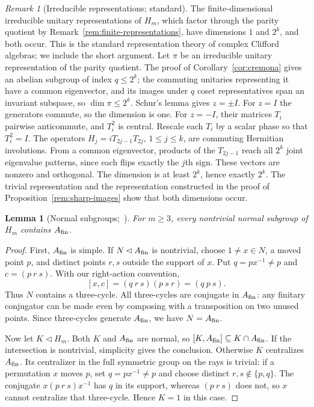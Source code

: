 \documentclass[11pt,a4paper]{article}
\theoremstyle{plain}
\newtheorem{lemma}[theorem]{Lemma}
\theoremstyle{definition}
\theoremstyle{remark}
\newtheorem*{remark*}{Remark}
\begin{document}
\begin{remark*}[Irreducible representations; standard]
The finite-dimensional irreducible unitary representations of $H_m$, which factor through the parity quotient by
Remark~\ref{rem:finite-representations}, have dimensions $1$ and $2^k$, and both occur. This is the standard representation theory of
complex Clifford algebras; we include the short argument.
Let $\pi$ be an irreducible unitary representation of the parity quotient. The proof of Corollary~\ref{cor:cremona} gives an abelian subgroup
of index $q\le2^k$; the commuting unitaries representing it have a common eigenvector, and its images under $q$ coset representatives span
an invariant subspace, so $\dim\pi\le2^k$. Schur's lemma gives $z=\pm I$. For $z=I$ the generators commute, so the dimension is one. For $z=-I$, their matrices
$T_i$ pairwise anticommute, and $T_i^2$ is central. Rescale each $T_i$ by a scalar phase so that $T_i^2=I$. The operators
$H_j=iT_{2j-1}T_{2j}$, $1\le j\le k$, are commuting Hermitian involutions. From a common eigenvector, products of the $T_{2j-1}$ reach
all $2^k$ joint eigenvalue patterns, since each flips exactly the $j$th sign. These vectors are nonzero and orthogonal. The dimension
is at least $2^k$, hence exactly $2^k$. The trivial representation and the representation constructed in the proof of
Proposition~\ref{rem:sharp-images} show that both dimensions occur.
\end{remark*}

\begin{lemma}[{Normal subgroups;~\cite[proof of Proposition~5.5]{CGP07}}]\label{lem:normal-subgroups}
For $m\ge3$, every nontrivial normal subgroup of $H_m$ contains $A_{\rm fin}$.
\end{lemma}
\begin{proof}
First, $A_{\rm fin}$ is simple. If $N\lhd A_{\rm fin}$ is nontrivial, choose $1\ne x\in N$, a moved point $p$, and distinct points
$r,s$ outside the support of $x$. Put $q=px^{-1}\ne p$ and $c=(p\ r\ s)$. With our right-action convention,
\[
[x,c]=(q\ r\ s)(p\ s\ r)=(q\ p\ s).
\]
Thus $N$ contains a three-cycle. All three-cycles are conjugate in $A_{\rm fin}$: any finitary conjugator can be made even by
composing with a transposition on two unused points. Since three-cycles generate $A_{\rm fin}$, we have $N=A_{\rm fin}$.

Now let $K\lhd H_m$. Both $K$ and $A_{\rm fin}$ are normal, so
$[K,A_{\rm fin}]\subseteq K\cap A_{\rm fin}$. If the intersection is nontrivial, simplicity gives the conclusion.
Otherwise $K$ centralizes $A_{\rm fin}$. Its centralizer in the full symmetric group on the rays is trivial: if a permutation $x$
moves $p$, set $q=px^{-1}\ne p$ and choose distinct $r,s\notin\{p,q\}$. The conjugate $x(p\ r\ s)x^{-1}$ has $q$ in its support,
whereas $(p\ r\ s)$ does not, so $x$ cannot centralize that three-cycle. Hence $K=1$ in this case.
\end{proof}
\end{document}
